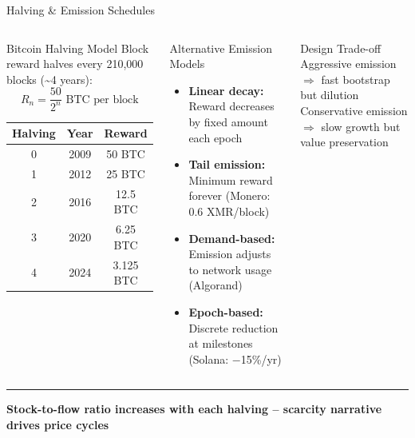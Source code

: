 \documentclass[8pt,aspectratio=169]{beamer}
\newcommand{\bottomnote}[1]{\vfill\vspace{-2mm}\textcolor{mllavender2}{\rule{\textwidth}{0.4pt}}\vspace{1mm}\footnotesize\textbf{#1}}
\begin{document}
\begin{frame}{Halving \& Emission Schedules}
\begin{columns}[T]
\begin{block}{Bitcoin Halving Model}
\footnotesize
Block reward halves every 210,000 blocks (\textasciitilde4 years):
\[
R_n = \frac{50}{2^n} \text{ BTC per block}
\]
\begin{tabular}{ccc}
\toprule
\textbf{Halving} & \textbf{Year} & \textbf{Reward} \\
\midrule
0 & 2009 & 50 BTC \\
1 & 2012 & 25 BTC \\
2 & 2016 & 12.5 BTC \\
3 & 2020 & 6.25 BTC \\
4 & 2024 & 3.125 BTC \\
\bottomrule
\end{tabular}
\end{block}

\begin{block}{Alternative Emission Models}
\footnotesize
\begin{itemize}
  \item \textbf{Linear decay:} Reward decreases by fixed amount each epoch
  \item \textbf{Tail emission:} Minimum reward forever (Monero: 0.6 XMR/block)
  \item \textbf{Demand-based:} Emission adjusts to network usage (Algorand)
  \item \textbf{Epoch-based:} Discrete reduction at milestones (Solana: $-$15\%/yr)
\end{itemize}
\end{block}
\vspace{1mm}
\begin{exampleblock}{\footnotesize Design Trade-off}
\footnotesize
Aggressive emission $\Rightarrow$ fast bootstrap but dilution\\
Conservative emission $\Rightarrow$ slow growth but value preservation
\end{exampleblock}
\end{columns}
\bottomnote{Stock-to-flow ratio increases with each halving -- scarcity narrative drives price cycles}
\end{frame}
\end{document}
